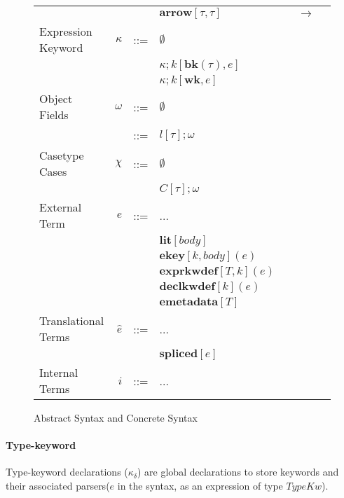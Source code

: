 \documentclass{sig-alternate}
\makeatletter
\newcommand\BeraMonottfamily{%
  \def\fvm@Scale{0.85}%
  \fontfamily{fvm}\selectfont%
}
\newcommand{\textcd}[1]{\text{\scriptsize\BeraMonottfamily{#1}}}
\makeatother
\begin{document}
\begin{figure*}
\begin{center}
\begin{tabular}{ l r l l l l l}
                      &                   &     &  $\mathbf{arrow}[\tau, \tau]$     & \textcd{type}      & $\rightarrow$ & \textcd{type> `->' type>}\\
  Expression Keyword  & $\kappa$          & ::= &  $\emptyset$\\
                      &                   &     &  $\kappa;k[\mathbf{bk}(\tau),e]$\\
                      &                   &     &  $\kappa;k[\mathbf{wk},e]$\\
  Object Fields       & $\omega$          & ::= &  $\emptyset$\\
                      &                   & ::= &  $l[\tau];\omega$\\
  Casetype Cases      & $\chi$            & ::= &  $\emptyset$\\
                      &                   &     &  $C[\tau];\omega$\\
  External Term       & $e$               & ::= &  ... \\
                      &                   &     &  $\mathbf{lit}[body]$\\
                      &                   &     &  $\mathbf{ekey}[k,body](e)$\\
                      &                   &     &  $\mathbf{exprkwdef}[T,k](e)$\\
                      &                   &     &  $\mathbf{declkwdef}[k](e)$\\
                      &                   &     &  $\mathbf{emetadata}[T]$\\
  Translational Terms & $\hat{e}$         & ::= &  ... \\
                      &                   &     &  $\mathbf{spliced}[e]$\\
  Internal Terms      & $i$               & ::= &  ... \\
\end{tabular}
\end{center}
\vspace{-8px}
\caption{Abstract Syntax and Concrete Syntax}
\vspace{-10px}
\label{formal-syntax}
\end{figure*}

\paragraph{Type-keyword}
Type-keyword declarations ($\kappa_{\delta}$) are global declarations to store keywords and their associated parsers($e$ in the syntax, as an expression of type $TypeKw$).  
\end{document}
